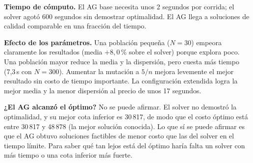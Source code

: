 \textbf{Tiempo de cómputo.} El AG base necesita unos 2 segundos por corrida; el solver agotó 600 segundos sin demostrar optimalidad. El AG llega a soluciones de calidad comparable en una fracción del tiempo.

\textbf{Efecto de los parámetros.} Una población pequeña ($N=30$) empeora claramente los resultados (media $+8{,}0\,\%$ sobre el solver) porque explora poco. Una población mayor reduce la media y la dispersión, pero cuesta más tiempo (7,3\,s con $N=300$). Aumentar la mutación a $5/n$ mejora levemente el mejor resultado sin costo de tiempo importante. La configuración extendida logra la mejor media y la menor dispersión al precio de unos 17 segundos.

\textbf{¿El AG alcanzó el óptimo?} No se puede afirmar. El solver no demostró la optimalidad, y su mejor cota inferior es 30\,817, de modo que el costo óptimo está entre 30\,817 y 48\,878 (la mejor solución conocida). Lo que sí se puede afirmar es que el AG obtuvo soluciones factibles de menor costo que las del solver en el tiempo límite. Para saber qué tan lejos está del óptimo haría falta un solver con más tiempo o una cota inferior más fuerte.
